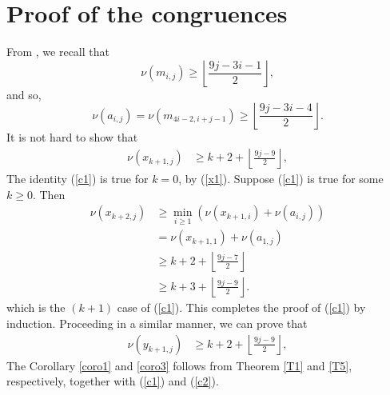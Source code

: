 \documentclass[11pt,a4paper]{article}
\numberwithin{equation}{section}
\theoremstyle{plain}
\begin{document}
	\section{Proof of the congruences}
	From \cite[Lemma (3.2)]{tang}, we recall that
	\[\nu(m_{i,j})\ge\left\lfloor\frac{9j-3i-1}{2}\right\rfloor,\]
	and so,
	\[\nu(a_{i,j})=\nu(m_{4i-2,i+j-1})\ge\left\lfloor\frac{9j-3i-4}{2}\right\rfloor.\]
	It is not hard to show that
	\begin{align}
		\nu(x_{{k+1},j})
			&\ge k+2+\left\lfloor\frac{9j-9}{2}\right\rfloor,\label{c1}
	\end{align}
	The identity (\ref{c1}) is true for \(k=0\), by (\ref{x1}).
	Suppose (\ref{c1}) is true for some \(k\ge0\). Then
	\begin{align*}
		\nu(x_{k+2,j})
		&\ge \min_{i\ge1}\left(\nu(x_{k+1,i})+\nu(a_{i,j})\right)\\
		&=\nu(x_{k+1,1})+\nu(a_{1,j})\\
		&\ge k+2+\left\lfloor\frac{9j-7}{2}\right\rfloor\\
			&\ge k+3+\left\lfloor\frac{9j-9}{2}\right\rfloor.
			\end{align*}
	which is the \((k+1)\) case of (\ref{c1}). This completes the proof of (\ref{c1}) by induction.
Proceeding in a similar manner, we can prove that
		\begin{align}
		\nu(y_{{k+1},j})
		&\ge k+2+\left\lfloor\frac{9j-9}{2}\right\rfloor,\label{c2}
	\end{align}
	The Corollary \ref{coro1}  and \ref{coro3} follows from Theorem \ref{T1} and \ref{T5},  respectively, together with (\ref{c1}) and (\ref{c2}).
\end{document}
